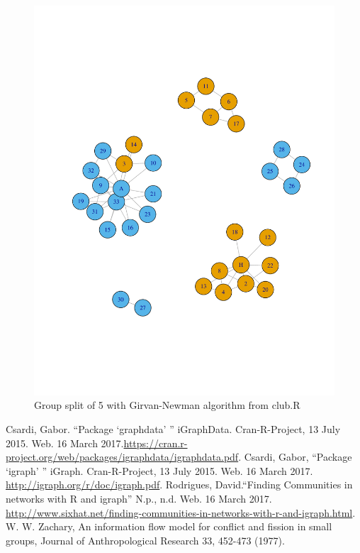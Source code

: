 \documentclass[letterpaper,11pt]{article}
\begin{document}
\begin{figure}[h]
\centering
\includegraphics[scale=0.6]{predictedSplit5.pdf}
\caption{Group split of 5 with Girvan-Newman algorithm from club.R}
\label{fig:split5}
\end{figure}



\clearpage


\begin{thebibliography}{9}
Csardi, Gabor. ``Package `graphdata' '' iGraphData. Cran-R-Project, 13 July 2015. Web. 16 March 2017.\url{https://cran.r-project.org/web/packages/igraphdata/igraphdata.pdf}.
Csardi, Gabor, ``Package `igraph' '' iGraph. Cran-R-Project, 13 July 2015. Web. 16 March 2017. \url{http://igraph.org/r/doc/igraph.pdf}.
Rodrigues, David.``Finding Communities in networks with R and igraph'' N.p., n.d. Web. 16 March 2017. \url{http://www.sixhat.net/finding-communities-in-networks-with-r-and-igraph.html}.
W. W. Zachary, An information flow model for conflict and fission in small groups, Journal of Anthropological Research 33, 452-473 (1977).
\end{thebibliography}
\end{document}
